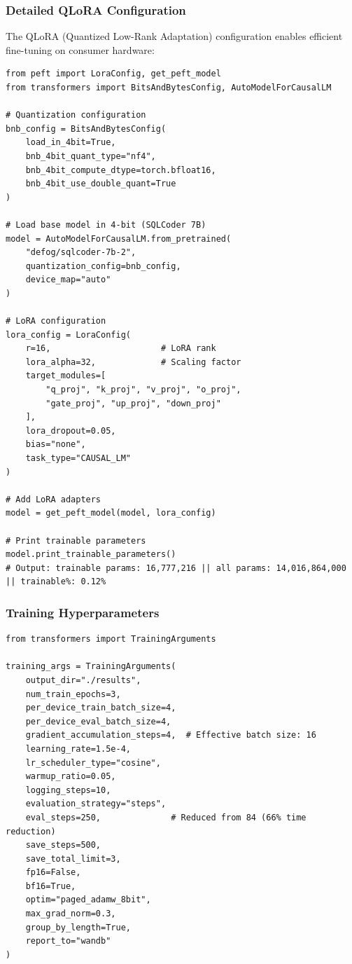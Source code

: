 \subsubsection{Detailed QLoRA Configuration}

The QLoRA (Quantized Low-Rank Adaptation) configuration enables efficient fine-tuning on consumer hardware:

\begin{lstlisting}[style=pythonstyle, caption=QLoRA fine-tuning technical configuration]
from peft import LoraConfig, get_peft_model
from transformers import BitsAndBytesConfig, AutoModelForCausalLM

# Quantization configuration
bnb_config = BitsAndBytesConfig(
    load_in_4bit=True,
    bnb_4bit_quant_type="nf4",
    bnb_4bit_compute_dtype=torch.bfloat16,
    bnb_4bit_use_double_quant=True
)

# Load base model in 4-bit (SQLCoder 7B)
model = AutoModelForCausalLM.from_pretrained(
    "defog/sqlcoder-7b-2",
    quantization_config=bnb_config,
    device_map="auto"
)

# LoRA configuration
lora_config = LoraConfig(
    r=16,                      # LoRA rank
    lora_alpha=32,             # Scaling factor
    target_modules=[
        "q_proj", "k_proj", "v_proj", "o_proj",
        "gate_proj", "up_proj", "down_proj"
    ],
    lora_dropout=0.05,
    bias="none",
    task_type="CAUSAL_LM"
)

# Add LoRA adapters
model = get_peft_model(model, lora_config)

# Print trainable parameters
model.print_trainable_parameters()
# Output: trainable params: 16,777,216 || all params: 14,016,864,000 || trainable%: 0.12%
\end{lstlisting}

\subsubsection{Training Hyperparameters}

\begin{lstlisting}[style=pythonstyle, caption=Training arguments configuration]
from transformers import TrainingArguments

training_args = TrainingArguments(
    output_dir="./results",
    num_train_epochs=3,
    per_device_train_batch_size=4,
    per_device_eval_batch_size=4,
    gradient_accumulation_steps=4,  # Effective batch size: 16
    learning_rate=1.5e-4,
    lr_scheduler_type="cosine",
    warmup_ratio=0.05,
    logging_steps=10,
    evaluation_strategy="steps",
    eval_steps=250,              # Reduced from 84 (66% time reduction)
    save_steps=500,
    save_total_limit=3,
    fp16=False,
    bf16=True,
    optim="paged_adamw_8bit",
    max_grad_norm=0.3,
    group_by_length=True,
    report_to="wandb"
)
\end{lstlisting}

